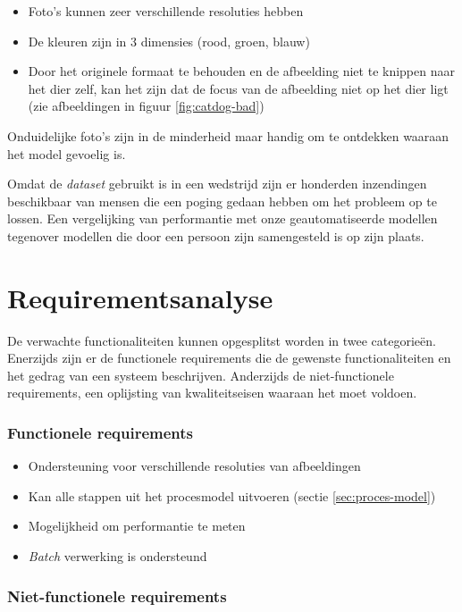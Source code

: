 \begin{itemize}
    \item Foto's kunnen zeer verschillende resoluties hebben
    \item De kleuren zijn in 3 dimensies (rood, groen, blauw)
    \item Door het originele formaat te behouden en de afbeelding niet te knippen naar het dier zelf, kan het zijn dat de focus van de afbeelding niet op het dier ligt (zie afbeeldingen in figuur \ref{fig:catdog-bad})
\end{itemize}

Onduidelijke foto's zijn in de minderheid maar handig om te ontdekken waaraan het model gevoelig is.

Omdat de \textit{dataset} gebruikt is in een wedstrijd zijn er honderden inzendingen beschikbaar van mensen die een poging gedaan hebben om het probleem op te lossen. Een vergelijking van performantie met onze geautomatiseerde modellen tegenover modellen die door een persoon zijn samengesteld is op zijn plaats.

\section{Requirementsanalyse}
\label{sec:requirements}

De verwachte functionaliteiten kunnen opgesplitst worden in twee categorieën. Enerzijds zijn er de functionele requirements die de gewenste functionaliteiten en het gedrag van een systeem beschrijven. Anderzijds de niet-functionele requirements, een oplijsting van kwaliteitseisen waaraan het moet voldoen.

\subsubsection{Functionele requirements}
\label{subsubsec:fr}

\begin{itemize}
    \item Ondersteuning voor verschillende resoluties van afbeeldingen
    \item Kan alle stappen uit het procesmodel uitvoeren (sectie \ref{sec:proces-model})
    \item Mogelijkheid om performantie te meten
    \item \textit{Batch} verwerking is ondersteund
\end{itemize}

\subsubsection{Niet-functionele requirements}
\label{subsubsec:nfr}


